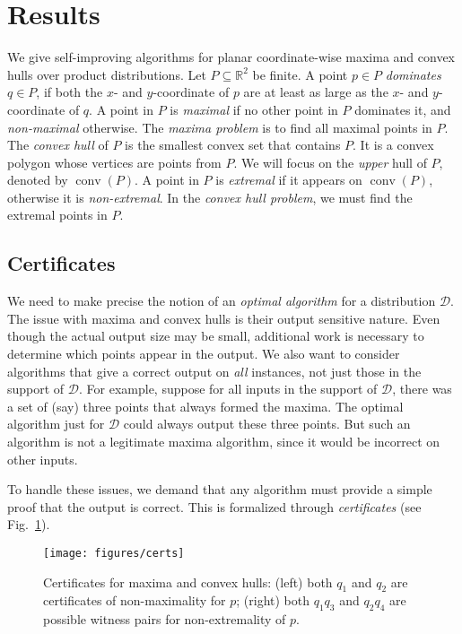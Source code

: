 \documentclass[letterpaper,11pt]{article}
\newcommand{\R}{\mathbb{R}}
\DeclareMathOperator{\UH}{conv}
\newcommand{\cD}{\mathcal{D}}
\begin{document}
\section{Results} 
\label{sec:results}

We give self-improving algorithms 
for planar coordinate-wise maxima
and convex hulls over product 
distributions. 
Let $P \subseteq \R^2$ be finite.
A point $p \in P$
\emph{dominates} $q \in P$,
if both the $x$- and $y$-coordinate
of $p$ are at least as large as
the $x$- and $y$-coordinate of $q$.
A point in $P$ is \emph{maximal}
if no other point in $P$ dominates
it, and \emph{non-maximal} otherwise.
The \emph{maxima problem} is
to find all maximal points in $P$.
The \emph{convex hull} of $P$ is the
smallest convex set that contains $P$.
It is a convex polygon whose vertices
are points from $P$. 
We will focus on the \emph{upper} hull of $P$,
denoted by $\UH(P)$.  A point in $P$
is \emph{extremal} if it appears on 
$\UH(P)$, otherwise it is 
\emph{non-extremal}. In the \emph{convex
hull problem}, we must find the extremal
points in $P$.

\subsection{Certificates}

We need to make precise the notion of an \emph{optimal algorithm}
for a distribution $\cD$. The 
issue with maxima and convex hulls
is their output sensitive nature.
Even though the actual output size
may be small, additional work 
is necessary to determine which
points appear in the output. We also want to consider algorithms
that give a correct output on \emph{all} instances, not just those
in the support of $\cD$. For example, suppose for all inputs in the support of $\cD$,
there was a set of (say) three points that always formed the maxima. The optimal
algorithm just for $\cD$ could always output these three points. But such an algorithm
is not a legitimate maxima algorithm, since it would be incorrect on other inputs.

To handle these issues, we demand that any algorithm must provide a simple proof
that the output is correct.
This is formalized through \emph{certificates} (see Fig.~\ref{fig:certs}).


\begin{figure}
  \centering
  \texttt{[image: figures/certs]}

   \caption{Certificates for maxima 
     and convex hulls: (left) both 
     $q_1$ and $q_2$ are certificates of 
     non-maximality for $p$; (right) 
     both $q_1q_3$ and $q_2q_4$ 
     are possible witness pairs 
     for non-extremality of $p$.
   }
  \label{fig:certs}
\end{figure}
\end{document}
